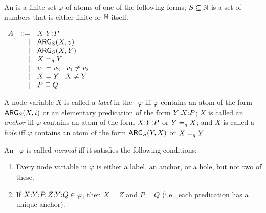 \begin{definition}\label{defn:rmrs-syntax}
  An \emph{\rmrs} is a finite set $\varphi$ of atoms of one of the
  following forms; $S \subseteq \mathbb{N}$ is a set of numbers that is either
  finite or $\mathbb{N}$ itself.

$\begin{array}{rrll}
A &::= &\ep{X}{Y}{P} \\ %
&| &\ARG_S(X,v) \\ %
&| &\ARG_S(X,Y) \\ %
&| &X \qeq Y \\ %
&| &v_1 = v_2 \;|\; v_1 \neq v_2 \\ %
&| &X = Y \;|\; X \neq Y \\ %
&| &P \spec Q %
\end{array}
$

A node variable $X$ is called a \emph{label} in the \rmrs\
$\varphi$ iff $\varphi$ contains an atom of the form $\mathsf{ARG}_S(X,i)$ or
an elementary predication of the form $Y {:} X {:} P$; $X$ is called an
\emph{anchor} iff $\varphi$ contains an atom of the form
$X {:} Y {:} P$ or $Y =_q X$; and $X$ is called a \emph{hole} iff
$\varphi$ contains an atom of the form $\mathsf{ARG}_S(Y,X)$ or $X =_q Y$.

An \rmrs\ $\varphi$ is called \emph{normal} iff it satisfies the
following conditions:
\begin{enumerate}
\item Every node variable in $\varphi$ is either a label, an anchor,
  or a hole, but not two of these.
\item If $X {:} Y {:} P, Z {:} Y {:} Q\in \varphi$, then $X=Z$ and $P=Q$
  (i.e., each predication has a unique anchor).
\end{enumerate}
\end{definition}

